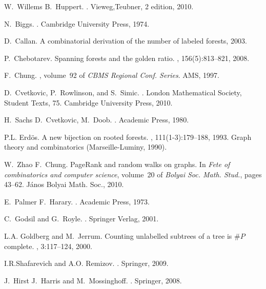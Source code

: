 \documentclass[12pt]{amsart}
\theoremstyle{definition}
\begin{document}
\begin{thebibliography}{10}

W.~Willems B.~Huppert.
.
\newblock Vieweg,Teubner, 2 edition, 2010.

N.~Biggs.
.
\newblock Cambridge University Press, 1974.

D.~Callan.
\newblock A combinatorial derivation of the number of labeled forests, 2003.

P.~Chebotarev.
\newblock Spanning forests and the golden ratio.
, 156(5):813--821, 2008.

F.~Chung.
, volume~92 of {\em CBMS Regional Conf.
  Series}.
\newblock AMS, 1997.

D.~Cvetkovic, P.~Rowlinson, and S.~Simic.
.
\newblock London Mathematical Society, Student Texts, 75. Cambridge University
  Press, 2010.

H.~Sachs D.~Cvetkovic, M.~Doob.
.
\newblock Academic Press, 1980.

P.L. Erd{\"{o}}s.
\newblock A new bijection on rooted forests.
, 111(1-3):179--188, 1993.
\newblock Graph theory and combinatorics (Marseille-Luminy, 1990).

W.~Zhao F.~Chung.
\newblock Page{R}ank and random walks on graphs.
\newblock In {\em Fete of combinatorics and computer science}, volume~20 of
  {\em Bolyai Soc. Math. Stud.}, pages 43--62. J\'anos Bolyai Math. Soc., 2010.

E.~Palmer F.~Harary.
.
\newblock Academic Press, 1973.

C.~Godsil and G.~Royle.
.
\newblock Springer Verlag, 2001.

L.A. Goldberg and M.~Jerrum.
\newblock Counting unlabelled subtrees of a tree is {$\#P$} complete.
, 3:117--124, 2000.

I.R.Shafarevich and A.O. Remizov.
.
\newblock Springer, 2009.

J.~Hirst J.~Harris and M.~Mossinghoff.
.
\newblock Springer, 2008.


\end{thebibliography}
\end{document}
